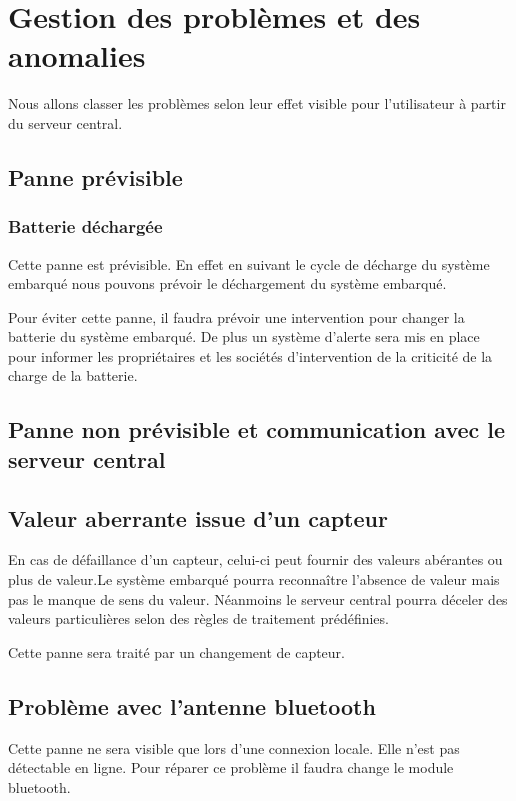\section{Gestion des problèmes et des anomalies}

Nous allons classer les problèmes selon leur effet visible pour l'utilisateur à 
partir du serveur central. 

\subsection{Panne prévisible}

\subsubsection{Batterie déchargée}

Cette panne est prévisible. En effet en suivant le cycle de décharge 
du système embarqué nous pouvons prévoir le déchargement du système embarqué. 

Pour éviter cette panne, il faudra prévoir une intervention pour changer la batterie
du système embarqué. De plus un système d'alerte sera mis en place pour informer
 les propriétaires et les sociétés d'intervention de la criticité de la charge 
de la batterie. 

\subsection{Panne non prévisible et communication avec le serveur central}

\subsection{Valeur aberrante issue d'un capteur}

En cas de défaillance d'un capteur, celui-ci peut fournir des valeurs abérantes 
ou plus de valeur.Le système embarqué pourra reconnaître l'absence de valeur mais
 pas le manque de sens du valeur. Néanmoins le serveur central pourra déceler des
 valeurs particulières selon des règles de traitement prédéfinies. 

Cette panne sera traité par un changement de capteur.

\subsection{Problème avec l'antenne bluetooth}

Cette panne ne sera visible que lors d'une connexion locale. Elle n'est pas 
détectable en ligne. Pour réparer ce problème il faudra change le module bluetooth.

